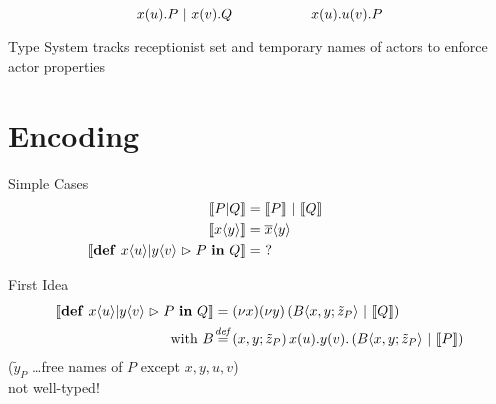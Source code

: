 \documentclass[]{beamer}
\begin{document}
    \begin{frame}{\actorpicalc}
      \begin{equation*}
        x(u) . P \ |\  x(v) . Q
        \hspace{2cm}
        x(u) . u(v) . P
      \end{equation*}
      \pause
      \begin{block}{Type System}
        tracks receptionist set and temporary names of actors
        to enforce actor properties
      \end{block}
    \end{frame}

  \section{Encoding}

    \begin{frame}{Simple Cases}
      \begin{align*}
        \encMJtoAP{P \jpar Q}
        &= \encMJtoAP{P} \apar \encMJtoAP{Q} \\
        \encMJtoAP{\jsnd{x}{y}}
        &= \asnd{x}{y} \\
        \encMJtoAP{\jdef{\jrct{\jrcv{x}{u} \jpat \jrcv{y}{v}}{P}}{Q}}
        &= \ ? \hspace{4cm}
      \end{align*}
    \end{frame}

    \begin{frame}{First Idea}
      \begin{align*}
        \encMJtoAP{\jdef{\jrct{\jrcv{x}{u} \jpat \jrcv{y}{v}}{P}}{Q}}
        &= \anew{x}{\anew{y}{\parens{\ains{B}{x, y}{\tilde{z}_P} \apar \encMJtoAP{Q}}}}
        \\
        \text{with }
        \adef*{B}{x,y}{\tilde{z}_P}{\arcv{x}{u} . \arcv{y}{v} . \parens{\ains{B}{x, y}{\tilde{z}_P} \apar \encMJtoAP{P}}}
      \end{align*}
      ($\tilde{y}_P$ \dots free names of $P$ except $x,y,u,v$)
      \\[1cm]
      \pause
      \center
      not well-typed!
    \end{frame}
\end{document}
